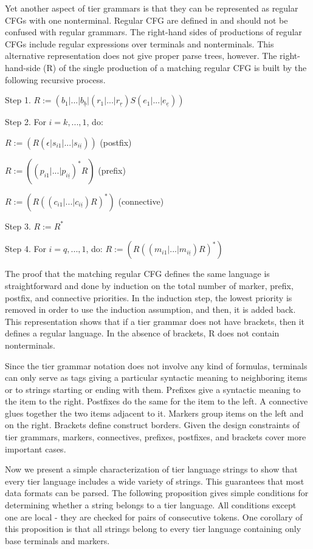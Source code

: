 \documentclass{llncs}
\begin{document}
Yet another aspect of tier grammars is that they can be represented as regular CFGs with one nonterminal. Regular CFG are defined in \cite{Berstel02} and should not be confused with regular grammars. The right-hand sides of productions of regular CFGs include regular expressions over terminals and nonterminals. This alternative representation does not give proper parse trees, however. The right-hand-side (R) of the single production of a matching regular CFG is built by the following recursive process.

\noindent
Step 1. $R := ( b_1 | ... | b_{\underline b} | ( r_1 | ... | r_{\underline r} ) S ( e_1 | ... | e_{\underline e} ) )$

\noindent
Step 2. For $i=k,...,1$, do: 

$R := ( R ( \epsilon | s_{i1} | ... | s_{i\underline i} ) )$ (postfix)

$R := ( ( p_{i1} | ... | p_{i\underline i} )^* R )$ (prefix)

$R := ( R ( ( c_{i1} | ... | c_{i\underline i} ) R )^* )$ (connective)

\noindent
Step 3. $R := R^*$

\noindent
Step 4. For $i=q,...,1$, do:
$R := ( R ( ( m_{i1} | ... | m_{i\underline i} ) R )^* )$

The proof that the matching regular CFG defines the same language is straightforward and done by induction on the total number of marker, prefix, postfix, and connective priorities. In the induction step, the lowest priority is removed in order to use the induction assumption, and then, it is added back. This representation shows that if a tier grammar does not have brackets, then it defines a regular language. In the absence of brackets, R does not contain nonterminals. 

Since the tier grammar notation does not involve any kind of formulas, terminals can only serve as tags giving a particular syntactic meaning to neighboring items or to strings starting or ending with them. Prefixes give a syntactic meaning to the item to the right. Postfixes do the same for the item to the left. A connective glues together the two items adjacent to it. Markers group items on the left and on the right. Brackets define construct borders. Given the design constraints of tier grammars, markers, connectives, prefixes, postfixes, and brackets cover more important cases.

Now we present a simple characterization of tier language strings to show that every tier language includes a wide variety of strings. This guarantees that most data formats can be parsed. The following proposition gives simple conditions for determining whether a string belongs to a tier language. All conditions except one are local - they are checked for pairs of consecutive tokens. One corollary of this proposition is that all strings belong to every tier language containing only base terminals and markers.
\end{document}
